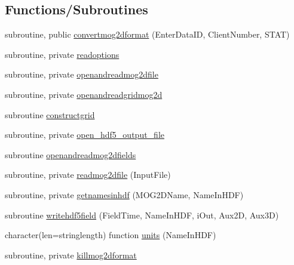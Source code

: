 \subsection*{Functions/\+Subroutines}
\begin{DoxyCompactItemize}
\item 
subroutine, public \mbox{\hyperlink{namespacemodulemog2dformat_a734bfcb7f534ab9c91af8672cea24021}{convertmog2dformat}} (Enter\+Data\+ID, Client\+Number, S\+T\+AT)
\item 
subroutine, private \mbox{\hyperlink{namespacemodulemog2dformat_a205a84f8a26a7043d7b186a44a8a530a}{readoptions}}
\item 
subroutine, private \mbox{\hyperlink{namespacemodulemog2dformat_a9fd3a03a7c7ed9e05602123a50dc5726}{openandreadmog2dfile}}
\item 
subroutine, private \mbox{\hyperlink{namespacemodulemog2dformat_aae3ca34111cfb5aa29845bcbac420694}{openandreadgridmog2d}}
\item 
subroutine \mbox{\hyperlink{namespacemodulemog2dformat_aec84c860ca2bbc962dda260595025f58}{constructgrid}}
\item 
subroutine, private \mbox{\hyperlink{namespacemodulemog2dformat_af04a77a337b8d48c2fd163ae89586914}{open\+\_\+hdf5\+\_\+output\+\_\+file}}
\item 
subroutine \mbox{\hyperlink{namespacemodulemog2dformat_a49362eefaf162d386ec42c4957e72b1a}{openandreadmog2dfields}}
\item 
subroutine, private \mbox{\hyperlink{namespacemodulemog2dformat_a49448dbf7a75da20faf8c9e64364c199}{readmog2dfile}} (Input\+File)
\item 
subroutine, private \mbox{\hyperlink{namespacemodulemog2dformat_af9424852561b70ff9a6dd1f247d73c37}{getnamesinhdf}} (M\+O\+G2\+D\+Name, Name\+In\+H\+DF)
\item 
subroutine \mbox{\hyperlink{namespacemodulemog2dformat_acbf2158af081eb0e8e9996387d7dfd5f}{writehdf5field}} (Field\+Time, Name\+In\+H\+DF, i\+Out, Aux2D, Aux3D)
\item 
character(len=stringlength) function \mbox{\hyperlink{namespacemodulemog2dformat_aa554861ca3342b570e56692003d31785}{units}} (Name\+In\+H\+DF)
\item 
subroutine, private \mbox{\hyperlink{namespacemodulemog2dformat_ad23545e02e1d7e1b08d7f23fc6220308}{killmog2dformat}}
\end{DoxyCompactItemize}
